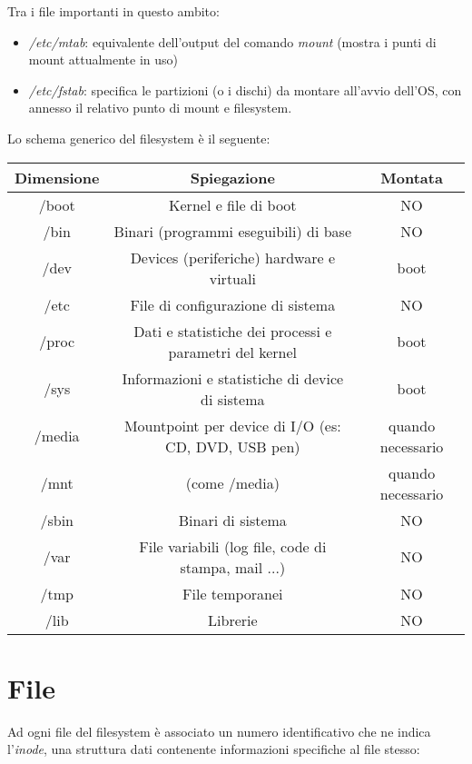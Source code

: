 Tra i file importanti in questo ambito:
\begin{itemize}
    \item \textit{/etc/mtab}: equivalente dell'output del comando \textit{mount} (mostra i punti di mount attualmente in uso)
    \item \textit{/etc/fstab}: specifica le partizioni (o i dischi) da montare all'avvio dell'OS, con annesso il relativo punto di mount e filesystem.
\end{itemize}

Lo schema generico del filesystem è il seguente:
\begin{center}
	\begin{tabular}{| c | c | c |}
		\hline
		\textbf{Dimensione}& \textbf{Spiegazione} & \textbf{Montata} \\ \hline
		/boot & Kernel e file di boot & NO \\ \hline
		/bin & Binari (programmi eseguibili) di base & NO \\ \hline
		/dev & Devices (periferiche) hardware e virtuali & boot \\ \hline
		/etc & File di configurazione di sistema & NO \\ \hline
		/proc & Dati e statistiche dei processi e parametri del kernel & boot \\ \hline
		/sys & Informazioni e statistiche di device di sistema & boot \\ \hline
		/media & Mountpoint per device di I/O (es:  CD, DVD, USB pen) & quando necessario \\ \hline
		/mnt & (come /media) & quando necessario \\ \hline
		/sbin & Binari di sistema & NO \\ \hline
		/var & File variabili (log file, code di stampa, mail ...) & NO \\ \hline
		/tmp & File temporanei & NO \\ \hline
		/lib & Librerie & NO \\ \hline
	\end{tabular}
\end{center}

\section{File}
Ad ogni file del filesystem è associato un numero identificativo che ne indica l'\textit{inode}, una struttura dati contenente informazioni specifiche al file stesso:

